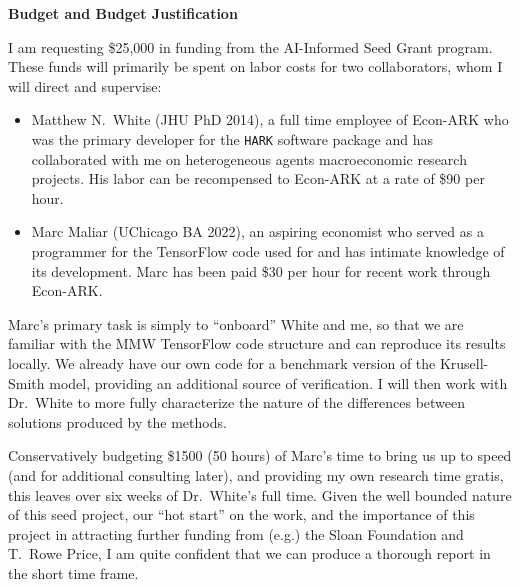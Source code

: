 \begin{center}
	\textbf{Budget and Budget Justification}
\end{center}

\noindent I am requesting \$25,000 in funding from the AI-Informed Seed Grant program. These funds will primarily be spent on labor costs for two collaborators, whom I will direct and supervise:
\begin{itemize}
	\item Matthew N.\ White (JHU PhD 2014), a full time employee of Econ-ARK who was the primary developer for the \texttt{HARK} software package and has collaborated with me on heterogeneous agents macroeconomic research projects. His labor can be recompensed to Econ-ARK at a rate of \$90 per hour. 
	
	\item Marc Maliar (UChicago BA 2022), an aspiring economist who served as a programmer for the TensorFlow code used for \cite{MALIAR202176} and has intimate knowledge of its development. Marc has been paid \$30 per hour for recent work through Econ-ARK.
\end{itemize}

\noindent Marc's primary task is simply to ``onboard'' White and me, so that we are familiar with the MMW TensorFlow code structure and can reproduce its results locally. We already have our own code for a benchmark version of the Krusell-Smith model, providing an additional source of verification. I will then work with Dr.\ White to more fully characterize the nature of the differences between solutions produced by the methods.

\vspace{0.2cm}

\noindent Conservatively budgeting \$1500 (50 hours) of Marc's time to bring us up to speed (and for additional consulting later), and providing my own research time gratis, this leaves over six weeks of Dr.\ White's full time. Given the well bounded nature of this seed project, our ``hot start'' on the work, and the importance of this project in attracting further funding from (e.g.) the Sloan Foundation and T.\ Rowe Price, I am quite confident that we can produce a thorough report in the short time frame.